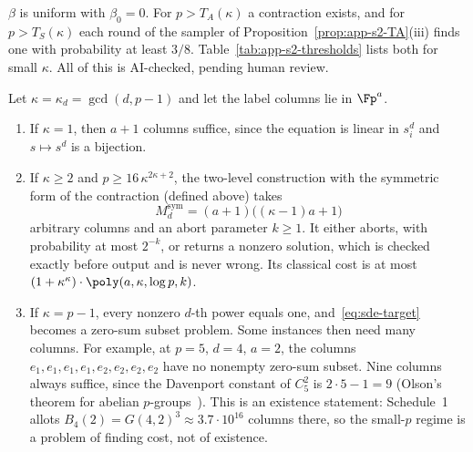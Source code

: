 $\beta$ is uniform with $\beta_0 = 0$. For $p > T_A(\kappa)$ a contraction exists, and for $p > T_S(\kappa)$ each round of the sampler of Proposition~\ref{prop:app-s2-TA}(iii) finds one with probability at least $3/8$. Table~\ref{tab:app-s2-thresholds} lists both for small $\kappa$. All of this is AI-checked, pending human review.

\begin{theorem}
\label{thm:power-sde}
Let $\kappa = \kappa_d = \gcd(d,p-1)$ and let the label columns lie in $\Fp^{a}$.
\begin{enumerate}[label=(\roman*),leftmargin=2em]
  \item If $\kappa = 1$, then $a + 1$ columns suffice, since the equation is linear in $s_i^d$ and $s \mapsto s^d$ is a bijection.
  \item If $\kappa \ge 2$ and $p \ge 16\,\kappa^{2\kappa+2}$, the two-level construction with the symmetric form of the contraction (defined above) takes
  \begin{equation}
    \label{eq:power-arity}
    M_d^{\mathrm{sym}} = (a+1)\bigl((\kappa-1)a+1\bigr)
  \end{equation}
  arbitrary columns and an abort parameter $k \ge 1$. It either aborts, with probability at most $2^{-k}$, or returns a nonzero solution, which is checked exactly before output and is never wrong. Its classical cost is at most $(1+\kappa^\kappa)\cdot\poly(a,\kappa,\log p,k)$.
  \item If $\kappa = p-1$, every nonzero $d$-th power equals one, and~\eqref{eq:sde-target} becomes a zero-sum subset problem. Some instances then need many columns. For example, at $p = 5$, $d = 4$, $a = 2$, the columns $e_1,e_1,e_1,e_1,e_2,e_2,e_2,e_2$ have no nonempty zero-sum subset. Nine columns always suffice, since the Davenport constant of $C_5^2$ is $2\cdot 5-1 = 9$ (Olson's theorem for abelian $p$-groups~\cite{Olson1969}). This is an existence statement: Schedule~1 allots $B_4(2) = G(4,2)^3 \approx 3.7\cdot 10^{16}$ columns there, so the small-$p$ regime is a problem of finding cost, not of existence.
\end{enumerate}
\end{theorem}

